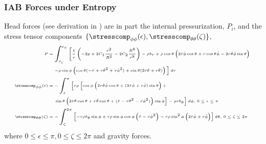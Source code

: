 \begin{frame}
	\frametitle{IAB Forces under Entropy}
	\tiny
	Head forces (see derivation in \cite[Appendix C.]{OgunmoluThesis}) are in part the  internal pressurization, $P_i$, and the stress tensor components $\{\stresscomp_{\phi \phi}(\epsilon), \stresscomp_{\theta \theta}(\zeta)\}$, 
	\begin{subequations}
		\tiny
		\begin{align}
		P  &= \int_{r_i}^{r_\circ} \left[\frac{1}{r}\left(
		-2p + 2 C_1 \frac{r^2}{R^2} - 2 C_2 \frac{R^8}{r^8}
		\right) - \rho b_r +  \rho \cos \theta \left(2\dot{r}\dot{\phi}\cos\theta + r \cos\theta \ddot{\phi}-2r\dot{\theta}\dot{\phi}\sin\theta\right) \nonumber \right. \\
		& \left. \quad - \rho \sin\phi\left(\cos\theta (-\ddot{r}+r\dot{\theta}^2 + r\dot{\phi}^2)+\sin\theta(2 \dot{r}\dot{\theta}+r\ddot{\theta})\right) \vphantom{}  \right] dr \label{eq:radial-stress-integ} \\
		\stresscomp_{\phi \phi}(\epsilon) &= 
		- \int_{\epsilon}^{\pi} \left[ r \rho\left[\cos \phi\left(2 r \dot{\theta} \dot{\phi} \cos \theta +(2 \dot{r} \dot{\phi}+r \ddot{\phi}) \sin \theta\right)+\right.  \right. \nonumber \\ 
		& \quad \left. \left. \sin \theta
		\left(2 \dot{r} \dot{\theta} \cos \theta +r \ddot{\theta} \cos \theta +(\ddot{r}- r\dot{\theta}^{2}-r\dot{\phi}^{2}) \right) \sin \phi  \vphantom{} \right] - \rho r b _\theta \vphantom{} \right]d\phi, \, 0 \le \epsilon \le \pi
		\label{eq:azim-stress-integ} \\
		\stresscomp_{\theta \theta}(\zeta) &= %
		- \int_{\zeta}^{2\pi}	\left[-r \rho b_{\theta}\sin\phi + r  \rho \sin\phi \cos \phi\left(\ddot{r} - r \dot{\phi}^2 \right)  - r  \rho \sin^2\phi \left(2 \dot{r}\dot{\phi} + r \ddot{\phi}\right) \right]d\theta, \,  0 \le \zeta \le 2 \pi %
		\label{eq:polar-stress-integ}
		\end{align}
		\label{eq:stress-integ}
	\end{subequations}
	 where $0 \le \epsilon \le \pi, 0 \le \zeta \le 2 \pi$ and  gravity forces. 
\end{frame}

